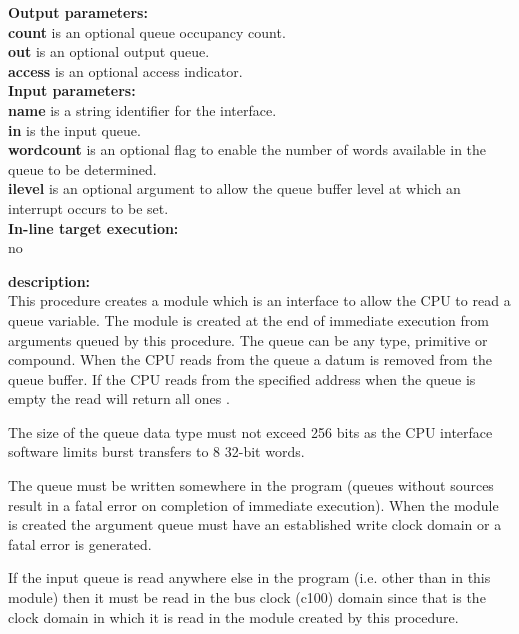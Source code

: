             {\bf Output parameters:} \\
            {\bf count} is an optional queue occupancy count.\\
            {\bf out} is an optional output queue.\\
            {\bf access} is an optional access indicator.\\        

            {\bf Input parameters:} \\            
            {\bf name} is a string identifier for the interface.\\
            {\bf in} is the input queue.\\            
            {\bf wordcount} is an optional flag to enable the number of words
            available in the queue to be determined.\\
            {\bf ilevel} is an optional argument to allow the queue buffer level
            at which an interrupt occurs to be set.\\
        
            {\bf In-line target execution:} \\
            no

            {\bf description:} \\
            This procedure creates a module which is an interface to allow the CPU
            to read a queue variable. The module is created at the end of immediate
            execution from arguments queued by this procedure. The queue can be any
            type, primitive or compound. When the CPU reads from the queue a datum
            is removed from the queue buffer. If the CPU reads from the specified
            address when the queue is empty the read will return all ones .

            The size of the queue data type must not exceed 256 bits as the CPU
            interface software limits burst transfers to 8 32-bit words.

            The queue must be written somewhere in the program (queues without
            sources result in a fatal error on completion of immediate execution).
            When the module is created the argument queue must have an established
            write clock domain or a fatal error is generated.

            If the input queue is read anywhere else in the program (i.e. other than
            in this module) then it must be read in the bus clock (c100) domain
            since that is the clock domain in which it is read in the module created
            by this procedure.


